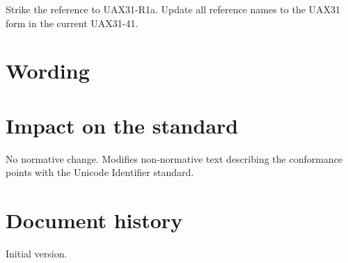 \documentclass[a4paper,10pt,oneside,openany,final,article]{memoir}
\begin{document}
Strike the reference to UAX31-R1a. Update all reference names to the UAX31 form in the current UAX31-41.

\chapter{Wording}


\begin{wording}



\end{wording}

\chapter{Impact on the standard}

No normative change. Modifies non-normative text describing the conformance points with the Unicode Identifier standard.

\chapter*{Document history}
Initial version.
\end{document}
